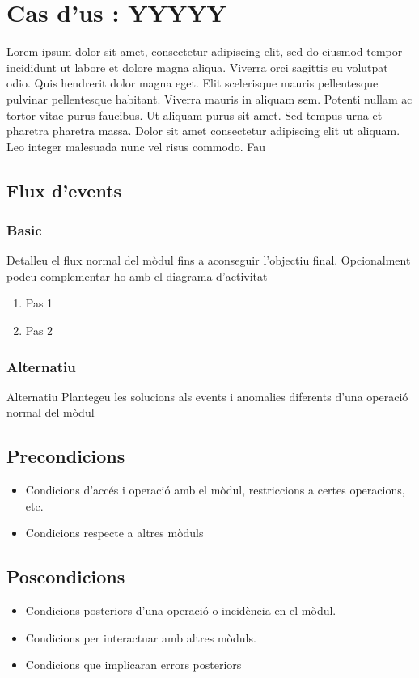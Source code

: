 \section{Cas d’us : YYYYY}\label{sec:uc0}

Lorem ipsum dolor sit amet, consectetur adipiscing elit, sed do eiusmod tempor incididunt ut labore et dolore magna aliqua. Viverra orci sagittis eu volutpat odio. Quis hendrerit dolor magna eget. Elit scelerisque mauris pellentesque pulvinar pellentesque habitant. Viverra mauris in aliquam sem. Potenti nullam ac tortor vitae purus faucibus. Ut aliquam purus sit amet. Sed tempus urna et pharetra pharetra massa. Dolor sit amet consectetur adipiscing elit ut aliquam. Leo integer malesuada nunc vel risus commodo. Fau

\subsection{Flux d’events}

\subsubsection{Basic}
Detalleu el flux normal del mòdul fins a aconseguir l'objectiu final. Opcionalment podeu complementar-ho amb el diagrama d'activitat

\begin{enumerate}
\item Pas 1
\item Pas 2
\end{enumerate}

  \subsubsection{Alternatiu}
Alternatiu
Plantegeu les solucions als events i anomalies diferents d'una operació normal del mòdul
\subsection{Precondicions}
\begin{itemize}
\item Condicions d'accés i operació amb el mòdul, restriccions a certes operacions, etc.
\item Condicions respecte a altres mòduls
\end{itemize}
\subsection{Poscondicions}
\begin{itemize}
\item Condicions posteriors d'una operació o incidència en el mòdul.
\item Condicions per interactuar amb altres mòduls.
\item Condicions que implicaran errors posteriors
\end{itemize}
